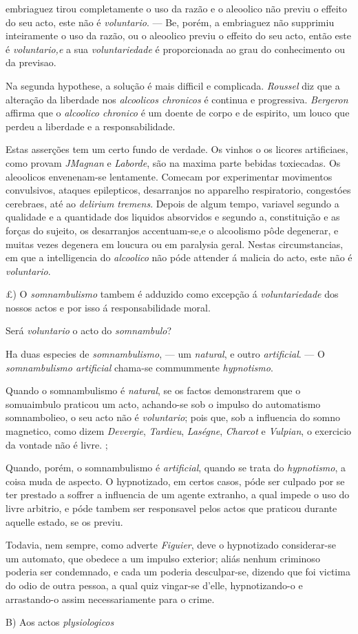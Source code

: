 embriaguez tirou completamente o uso da razão e o aleoolico não previu o effeito do seu acto, este não é \emph{voluntario}. --- Be, porém, a embriaguez não supprimiu inteiramente o uso da razão, ou o aleoolico previu o effeito do seu acto, então este é \emph{voluntario,e} a sua \emph{voluntariedade} é proporcionada ao grau do conhecimento ou da previsao.\par Na segunda hypothese, a solução é mais difficil e complicada. \emph{Roussel} diz que a alteração da liberdade nos \emph{alcoolicos chronicos} é continua e progressiva. \emph{Bergeron} affirma que o \emph{alcoolico chronico} é um doente de corpo e de espirito, um louco que perdeu a liberdade e a responsabilidade.\par Estas asserções tem um certo fundo de verdade. Os vinhos o os licores artificiaes, como provam \emph{JMagnan} e \emph{Laborde}, são na maxima parte bebidas toxiecadas. Os aleoolicos envenenam-se lentamente. Comecam por experimentar movimentos convulsivos, ataques epilepticos, desarranjos no apparelho respiratorio, congestóes cerebraes, até ao \emph{delirium tremens}. Depois de algum tempo, variavel segundo a qualidade e a quantidade dos liquidos absorvidos e segundo a, constituição e as forças do sujeito, os desarranjos accentuam-se,e o alcoolismo pôde degenerar, e muitas vezes degenera em loucura ou em paralysia geral. Nestas circumstancias, em que a intelligencia do \emph{alcoolico} não póde attender á malicia do acto, este não é \emph{voluntario}.\par £) O \emph{somnambulismo} tambem é adduzido como excepção á \emph{voluntariedade} dos nossos actos e por isso á responsabilidade moral.\par Será \emph{voluntario} o acto do \emph{somnambulo}?\par Ha duas especies de \emph{somnambulismo}, --- um \emph{natural}, e outro \emph{artificial}. --- O \emph{somnambulismo artificial} chama-se commummente \emph{hypnotismo}.\par Quando o somnambulismo é \emph{natural}, se os factos demonstrarem que o somuaimbulo praticou um acto, achando-se sob o impulso do automatismo somnambolieo, o seu acto não é \emph{voluntario}; pois que, sob a influencia do somno magnetico, como dizem \emph{Devergie}, \emph{Tardieu}, \emph{Laségne}, \emph{Charcot} e \emph{Vulpian}, o exercicio da vontade não é livre. ;\par Quando, porém, o somnambulismo é \emph{artificial}, quando se trata do \emph{hypnotismo}, a coisa muda de aspecto. O hypnotizado, em certos casos, póde ser culpado por se ter prestado a soffrer a influencia de um agente extranho, a qual impede o uso do livre arbitrio, e póde tambem ser responsavel pelos actos que praticou durante aquelle estado, se os previu.\par Todavia, nem sempre, como adverte \emph{Figuier}, deve o hypnotizado considerar-se um automato, que obedece a um impulso exterior; aliás nenhum criminoso poderia ser condemnado, e cada um poderia desculpar-se, dizendo que foi victima do odio de outra pessoa, a qual quiz vingar-se d'elle, hypnotizando-o e arrastando-o assim necessariamente para o crime.\par B) Aos actos \emph{plysiologicos} 